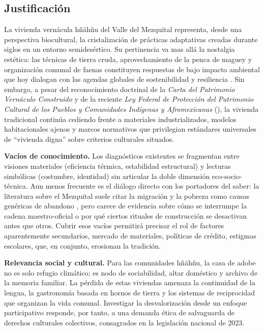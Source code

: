 \subsection{Justificación}

La vivienda vernácula hñähñu del Valle del Mezquital representa, desde
una perspectiva biocultural, la cristalización de prácticas adaptativas
creadas durante siglos en un entorno semidesértico.  Su pertinencia
va mas allá la nostalgia estética: las técnicas de tierra cruda,
aprovechamiento de la penca de maguey y organización comunal de faenas
constituyen respuestas de bajo impacto ambiental que hoy dialogan con
las agendas globales de sostenibilidad y resiliencia \citep{gudynas2010desarrollo}.
Sin embargo, a pesar del reconocimiento doctrinal de la
\emph{Carta del Patrimonio Vernáculo Construido} \citep{icomos1999carta}
y de la reciente \emph{Ley Federal de Protección del Patrimonio Cultural
	de los Pueblos y Comunidades Indígenas y Afromexicanas}
(\citeyear{ley2023patrimonio}), la vivienda tradicional continúa cediendo
frente a materiales industrializados, modelos habitacionales ajenos y
marcos normativos que privilegian estándares universales de ``vivienda
digna'' sobre criterios culturales situados.

\textbf{Vacíos de conocimiento.}
Los diagnósticos existentes se fragmentan entre visiones materiales
(eficiencia térmica, estabilidad estructural) y lecturas simbólicas
(costumbre, identidad) sin articular la doble dimensión
eco-socio-técnica.  Aun menos frecuente es el diálogo directo con los
portadores del saber: la literatura sobre el Mezquital suele citar la
migración y la pobreza como causas genéricas de abandono
\citep{alvarez2003maguey, juarez2018transformacion}, pero carece de
evidencia sobre cómo se interrumpe la cadena
maestro-oficial o por qué ciertos rituales de construcción se
desactivan antes que otros.  Cubrir esos vacíos permitirá precisar el
rol de factores aparentemente secundarios, mercado de materiales,
políticas de crédito, estigmas escolares, que, en conjunto, erosionan la
tradición.

\textbf{Relevancia social y cultural.}
Para las comunidades hñähñu, la casa de adobe no es solo refugio
climático; es nodo de sociabilidad, altar doméstico y archivo de la
memoria familiar.  La pérdida de estas viviendas amenaza la continuidad
de la lengua, la gastronomía basada en hornos de tierra y los sistemas
de reciprocidad que organizan la vida comunal.  Investigar la
desvalorización desde un enfoque participativo responde, por tanto, a
una demanda ética de salvaguarda de derechos culturales colectivos,
consagrados en la legislación nacional de 2023.


